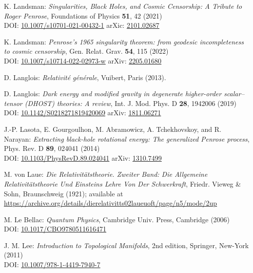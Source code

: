 \begin{thebibliography}{123}
K. Landsman:
{\em Singularities, Black Holes, and Cosmic Censorship:
A Tribute to Roger Penrose},
Foundations of Physics {\bf 51}, 42 (2021)\\
DOI: \href{https://doi.org/10.1007/s10701-021-00432-1}{10.1007/s10701-021-00432-1}\hfill
arXic: \href{https://arxiv.org/abs/2101.02687}{2101.02687}

K. Landsman:
{\em Penrose's 1965 singularity theorem: from geodesic incompleteness to cosmic censorship},
Gen. Relat. Grav. {\bf 54}, 115 (2022)\\
DOI: \href{https://doi.org/10.1007/s10714-022-02973-w}{10.1007/s10714-022-02973-w}\hfill
arXiv: \href{https://arxiv.org/abs/2205.01680}{2205.01680}

D. Langlois:
{\em Relativité générale},
Vuibert, Paris (2013).

D. Langlois:
{\em Dark energy and modified gravity in degenerate higher-order scalar–tensor (DHOST) theories: A review},
Int. J. Mod. Phys. D {\bf 28}, 1942006 (2019)\\
DOI: \href{https://doi.org/10.1142/S0218271819420069}{10.1142/S0218271819420069}\hfill
arXiv: \href{https://arxiv.org/abs/1811.06271}{1811.06271}

J.-P. Lasota, E. Gourgoulhon, M. Abramowicz, A. Tchekhovskoy,
and R. Narayan:
{\em Extracting black-hole rotational energy: The generalized Penrose process},
Phys. Rev. D {\bf 89}, 024041 (2014)  \\
DOI: \href{https://doi.org/10.1103/PhysRevD.89.024041}{10.1103/PhysRevD.89.024041}\hfill
arXiv: \href{https://arxiv.org/abs/1310.7499}{1310.7499}

M. von Laue: {\em Die Relativitätstheorie. Zweiter Band: Die Allgemeine Relativitätstheorie Und Einsteins Lehre Von Der Schwerkraft},
Friedr. Vieweg \& Sohn, Braunschweig (1921); available at \\
\url{https://archive.org/details/dierelativitts02laueuoft/page/n5/mode/2up}

M. Le Bellac:
{\em Quantum Physics},
Cambridge Univ. Press, Cambridge (2006)\\
DOI: \href{https://doi.org/10.1017/CBO9780511616471}{10.1017/CBO9780511616471}

J. M. Lee: {\em Introduction to Topological Manifolds}, 2nd edition,
Springer, New-York (2011)\\
DOI: \href{https://doi.org/10.1007/978-1-4419-7940-7}{10.1007/978-1-4419-7940-7}


\end{thebibliography}
